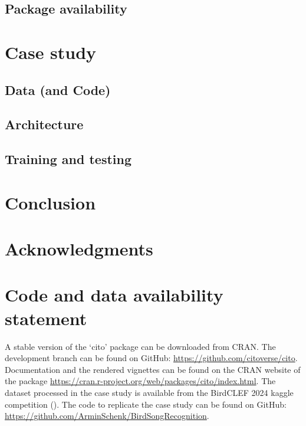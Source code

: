 \documentclass[12pt,twoside]{scrreport}
\newcommand{\pkg}[1]{`#1'}
\begin{document}
\section*{Package availability}
\chapter*{Case study}
\section*{Data (and Code)}
\section*{Architecture}
\section*{Training and testing}

\chapter*{Conclusion}

\chapter*{Acknowledgments}


\renewcommand{\bibname}{References}
 

\chapter*{Code and data availability statement}
A stable version of the \pkg{cito} package can be downloaded from CRAN. The development branch can be found on GitHub: \url{https://github.com/citoverse/cito}. Documentation and the rendered vignettes can be found on the CRAN website of the package \url{ https://cran.r-project.org/web/packages/cito/index.html}. The dataset processed in the case study is available from the BirdCLEF 2024 kaggle competition (\cite{birdclef-2024}). The code to replicate the case study can be found on GitHub: \url{https://github.com/ArminSchenk/BirdSongRecognition}.
\end{document}
